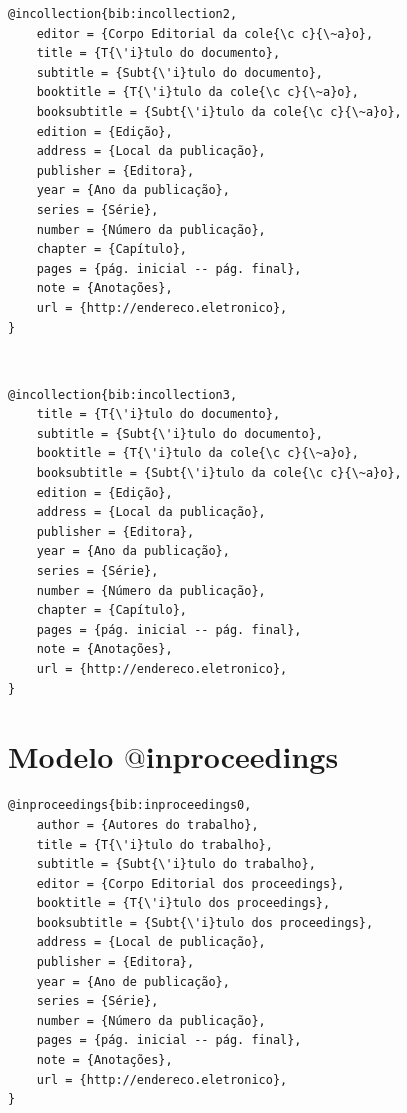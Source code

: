 \documentclass[a4paper,12pt,oneside,onecolumn,final,fleqn]{repUERJ}
\begin{document}
\noindent{}

\begin{verbatim}
@incollection{bib:incollection2,
    editor = {Corpo Editorial da cole{\c c}{\~a}o},
    title = {T{\'i}tulo do documento},
    subtitle = {Subt{\'i}tulo do documento},
    booktitle = {T{\'i}tulo da cole{\c c}{\~a}o},
    booksubtitle = {Subt{\'i}tulo da cole{\c c}{\~a}o},
    edition = {Edição},
    address = {Local da publicação},
    publisher = {Editora},
    year = {Ano da publicação},
    series = {Série},
    number = {Número da publicação},
    chapter = {Capítulo},
    pages = {pág. inicial -- pág. final},
    note = {Anotações},
    url = {http://endereco.eletronico},
}
\end{verbatim}

\noindent{}\\

\begin{verbatim}
@incollection{bib:incollection3,
    title = {T{\'i}tulo do documento},
    subtitle = {Subt{\'i}tulo do documento},
    booktitle = {T{\'i}tulo da cole{\c c}{\~a}o},
    booksubtitle = {Subt{\'i}tulo da cole{\c c}{\~a}o},
    edition = {Edição},
    address = {Local da publicação},
    publisher = {Editora},
    year = {Ano da publicação},
    series = {Série},
    number = {Número da publicação},
    chapter = {Capítulo},
    pages = {pág. inicial -- pág. final},
    note = {Anotações},
    url = {http://endereco.eletronico},
}
\end{verbatim}

\section{Modelo $@$inproceedings}

\noindent{}

\begin{verbatim}
@inproceedings{bib:inproceedings0,
    author = {Autores do trabalho},
    title = {T{\'i}tulo do trabalho},
    subtitle = {Subt{\'i}tulo do trabalho},
    editor = {Corpo Editorial dos proceedings},
    booktitle = {T{\'i}tulo dos proceedings},
    booksubtitle = {Subt{\'i}tulo dos proceedings},
    address = {Local de publicação},
    publisher = {Editora},
    year = {Ano de publicação},
    series = {Série},
    number = {Número da publicação},
    pages = {pág. inicial -- pág. final},
    note = {Anotações},
    url = {http://endereco.eletronico},
}
\end{verbatim}
\end{document}
